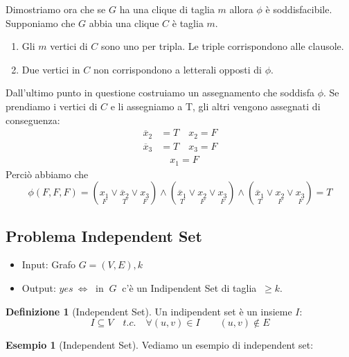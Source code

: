 \documentclass[a4paper]{article}
\theoremstyle{definition}
\newtheorem{esempio}{Esempio}[subsection]
\newtheorem{definit}{Definizione}[subsection]
\begin{document}
		\bigskip
		
		Dimostriamo ora che se $ G $ ha una clique di taglia $ m $ allora $ \phi $ è soddisfacibile. Supponiamo che $ G $ abbia una clique $ C $ è taglia $ m $.
		\begin{enumerate}
			\item Gli $ m $ vertici di $ C $ sono uno per tripla. Le triple corrispondono alle clausole.
			\item Due vertici in $ C $ non corrispondono a letterali opposti di $ \phi $.
		\end{enumerate}
		Dall'ultimo punto in questione costruiamo un assegnamento che soddisfa $ \phi $. Se prendiamo i vertici di $ C $ e li assegniamo a T, gli altri vengono assegnati di conseguenza:
		\begin{align*}
			\overline{x}_2 &= T \quad x_2 = F \\
			\overline{x}_3 &= T	\quad x_3 = F \\
						   &    \quad x_1 = F 
		\end{align*}
		Perciò abbiamo che
		\[
			\phi(F,F,F) =
			(\underset{F}{x_1} \vee \underset{T}{\overline{x}_2}\vee \underset{F}{x_3}) 
			\wedge (\underset{T}{\overline{x}_1}\vee \underset{F}{x_2} \vee \underset{F}{x_3}) 
			\wedge (\underset{T}{\overline{x}_1}\vee \underset{F}{x_2} \vee \underset{F}{x_3}) = T
		\]
		
	\subsection{Problema Independent Set}
		\begin{itemize}
			\item Input: Grafo $ G = (V, E), k $
			\item Output: $ yes\ \Leftrightarrow\  $ in $\ G\ $ c'è un Indipendent Set di taglia $\ \geq k $.
		\end{itemize}
		\begin{definit}[Independent Set]
			Un indipendent set è un insieme $ I $:
			\[
				I\subseteq V\quad t.c.\quad \forall (u,v)\in I\qquad (u,v)\notin E
			\]
			
		\end{definit}
		\begin{esempio}[Independent Set]
			Vediamo un esempio di independent set:\\
			\begin{figure}[h!]
				\centering
			\end{figure}
		\end{esempio}
		
\end{document}
